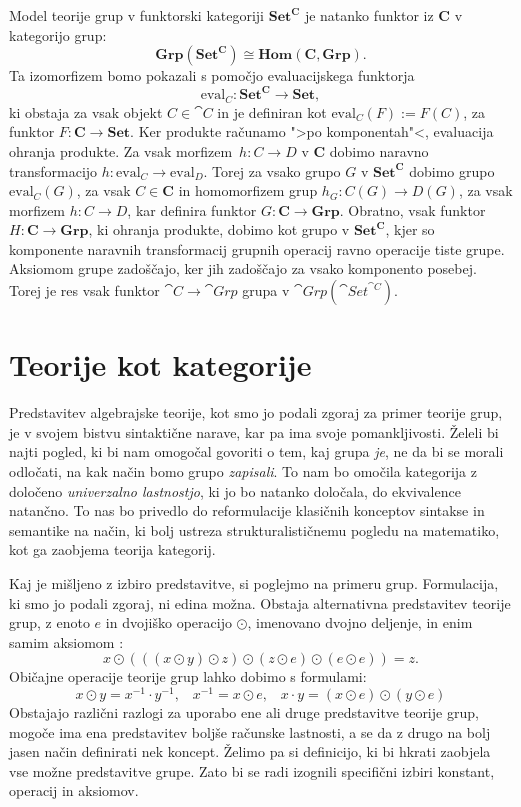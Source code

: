 \documentclass[../kategoricna_logika.tex]{subfiles}
\begin{document}
% 
\begin{primer}
  Model teorije grup v funktorski kategoriji $\mathbf{Set}^{\mathbf{C}}$ je
  natanko funktor iz $\mathbf{C}$ v kategorijo grup:
  \[ \mathbf{Grp}(\mathbf{Set}^{\mathbf{C}}) \cong \mathbf{Hom}(\mathbf{C}, \mathbf{Grp}). \]
  Ta izomorfizem bomo pokazali s pomočjo evaluacijskega funktorja
  \[ \mathrm{eval}_C : \mathbf{Set}^{\mathbf{C}} \to \mathbf{Set}, \]
  ki obstaja za vsak objekt $C \in \cat{C}$ in je definiran kot
  $\mathrm{eval}_{C}(F) := F(C)$, za funktor $F : \mathbf{C} \to \mathbf{Set}$.
  Ker produkte računamo ">po komponentah"<, evaluacija ohranja produkte.
  Za vsak morfizem~${h : C \to D}$ v $\mathbf{C}$ dobimo naravno
  transformacijo $h : \mathrm{eval}_{C} \to \mathrm{eval}_{D}$.
  Torej za vsako grupo $G$ v $\mathbf{Set}^{\mathbf{C}}$ dobimo grupo
  $\mathrm{eval}_{C}(G)$, za vsak $C \in \mathbf{C}$ in homomorfizem grup
  $h_{G} : C(G) \to D(G)$, za vsak morfizem $h : C \to D$,
  kar definira funktor $G : \mathbf{C} \to \mathbf{Grp}$.
  Obratno, vsak funktor $H : \mathbf{C} \to \mathbf{Grp}$, ki ohranja produkte,
  dobimo kot grupo v $\mathbf{Set}^{\mathbf{C}}$, kjer so komponente
  naravnih transformacij grupnih operacij ravno operacije tiste grupe.
  Aksiomom grupe zadoščajo, ker jih zadoščajo za vsako komponento posebej.
  Torej je res vsak funktor $\cat{C} \to \cat{Grp}$ grupa v $\cat{Grp}(\cat{Set}^{\cat{C}})$.
\end{primer}
%
\section{Teorije kot kategorije}
\label{sec:teorije-kot-kategorije}
Predstavitev algebrajske teorije, kot smo jo podali zgoraj za primer
teorije grup, je v svojem bistvu sintaktične narave, kar pa ima
svoje pomankljivosti.
Želeli bi najti pogled, ki bi nam omogočal govoriti o tem,
kaj grupa \emph{je}, ne da bi se morali odločati,
na kak način bomo grupo \emph{zapisali}.
To nam bo omočila kategorija z določeno \emph{univerzalno lastnostjo},
ki jo bo natanko določala, do ekvivalence natančno.
To nas bo privedlo do reformulacije klasičnih konceptov
sintakse in semantike na način, ki bolj ustreza strukturalističnemu pogledu na matematiko,
kot ga zaobjema teorija kategorij.

Kaj je mišljeno z izbiro predstavitve, si poglejmo na primeru grup.
Formulacija, ki smo jo podali zgoraj, ni edina možna.
Obstaja alternativna predstavitev teorije grup,
z enoto $e$ in dvojiško operacijo $\odot$,
imenovano dvojno deljenje, in enim samim aksiomom \cite{mccune1993single}:
$$x \odot (((x \odot y ) \odot z ) \odot ( z \odot e) \odot (e \odot e) ) = z.$$
Običajne operacije teorije grup lahko dobimo s formulami:
$$x \odot y = x^{-1} \cdot y^{-1} \text{,} \quad x^{-1} = x \odot e \text{,} \quad x \cdot y = (x \odot e) \odot (y \odot e)$$
%
Obstajajo različni razlogi za uporabo ene ali druge predstavitve
teorije grup, mogoče ima ena predstavitev boljše računske lastnosti,
a se da z drugo na bolj jasen način definirati nek koncept.
Želimo pa si definicijo, ki bi hkrati zaobjela vse možne predstavitve grupe.
Zato bi se radi izognili specifični izbiri konstant, operacij in aksiomov.
\end{document}
